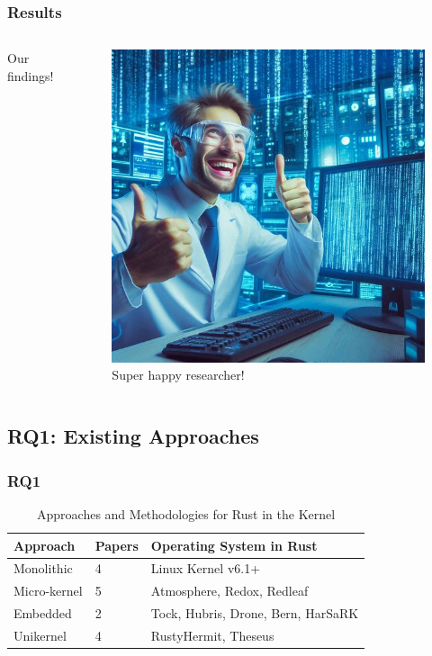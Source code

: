 \documentclass{beamer}
\begin{document}
\begin{frame}
  \frametitle{Results}
  \begin{columns}
    \begin{column}{0.5\textwidth}
      Our findings!
    \end{column}
    \begin{column}{0.5\textwidth}
      \begin{figure}
        \caption{Super happy researcher!\footnotemark[1]}
        \includegraphics[width=.8\textwidth]{images/results.jpeg}\footnotemark[1]
      \end{figure}
    \end{column}
  \end{columns}
\end{frame}

\subsection{RQ1: Existing Approaches}
\begin{frame}
  \frametitle{RQ1}
  \begin{table}
    \caption{Approaches and Methodologies for Rust in the Kernel}
    \begin{tabular}{||l|l|l||}
      \hline
      Approach & Papers & Operating System in Rust\\
      \hline\hline
      Monolithic   & 4 & Linux Kernel v6.1+\\
      Micro-kernel & 5 & Atmosphere, Redox, Redleaf\\
      Embedded     & 2 & Tock, Hubris, Drone, Bern, HarSaRK \\
      Unikernel & 4 & RustyHermit, Theseus \\
       \hline
    \end{tabular}
    \label{tab:RQ1}
  \end{table}

\end{frame}
\end{document}
